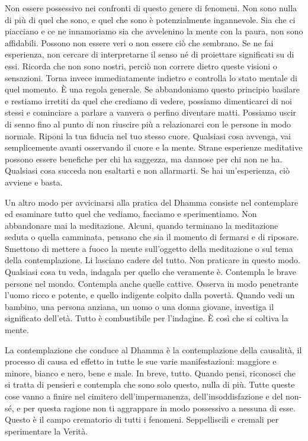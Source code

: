Non essere possessivo nei confronti di questo genere di fenomeni. Non
sono nulla di più di quel che sono, e quel che sono è potenzialmente
ingannevole. Sia che ci piacciano e ce ne innamoriamo sia che avvelenino
la mente con la paura, non sono affidabili. Possono non essere veri o
non essere ciò che sembrano. Se ne fai esperienza, non cercare di
interpretarne il senso né di proiettare significati su di essi. Ricorda
che non sono nostri, perciò non correre dietro queste visioni o
sensazioni. Torna invece immediatamente indietro e controlla lo stato
mentale di quel momento. È una regola generale. Se abbandoniamo questo
principio basilare e restiamo irretiti da quel che crediamo di vedere,
possiamo dimenticarci di noi stessi e cominciare a parlare a vanvera o
perfino diventare matti. Possiamo uscir di senno fino al punto di non
riuscire più a relazionarci con le persone in modo normale. Riponi la
tua fiducia nel tuo stesso cuore. Qualsiasi cosa avvenga, vai
semplicemente avanti osservando il cuore e la mente. Strane esperienze
meditative possono essere benefiche per chi ha saggezza, ma dannose per
chi non ne ha. Qualsiasi cosa succeda non esaltarti e non allarmarti. Se
hai un'esperienza, ciò avviene e basta.

Un altro modo per avvicinarsi alla pratica del Dhamma consiste nel
contemplare ed esaminare tutto quel che vediamo, facciamo e
sperimentiamo. Non abbandonare mai la meditazione. Alcuni, quando
terminano la meditazione seduta o quella camminata, pensano che sia il
momento di fermarsi e di riposare. Smettono di mettere a fuoco la mente
sull'oggetto della meditazione o sul tema della contemplazione. Li
lasciano cadere del tutto. Non praticare in questo modo. Qualsiasi cosa
tu veda, indagala per quello che veramente è. Contempla le brave persone
nel mondo. Contempla anche quelle cattive. Osserva in modo penetrante
l'uomo ricco e potente, e quello indigente colpito dalla povertà. Quando
vedi un bambino, una persona anziana, un uomo o una donna giovane,
investiga il significato dell'età. Tutto è combustibile per l'indagine.
È così che si coltiva la mente.

La contemplazione che conduce al Dhamma è la contemplazione della
causalità, il processo di causa ed effetto in tutte le sue varie
manifestazioni: maggiore e minore, bianco e nero, bene e male. In breve,
tutto. Quando pensi, riconosci che si tratta di pensieri e contempla che
sono solo questo, nulla di più. Tutte queste cose vanno a finire nel
cimitero dell'impermanenza, dell'insoddisfazione e del non-sé, e per
questa ragione non ti aggrappare in modo possessivo a nessuna di esse.
Questo è il campo crematorio di tutti i fenomeni. Seppelliscili e
cremali per sperimentare la Verità.

